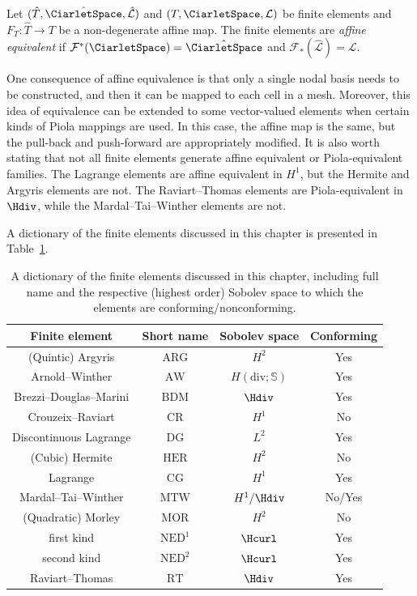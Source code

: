 \begin{definition}
  Let $(\hat{T}, \hat{\CiarletSpace}, \hat{\mathcal{L}})$ and
  $(T, \CiarletSpace, \mathcal{L})$ be finite elements and $F_T:
  \hat{T} \rightarrow T$ be a non-degenerate affine map. The finite
  elements are \emph{affine equivalent} if
  $\mathcal{F}^*(\CiarletSpace) = \hat{\CiarletSpace}$ and
  $\mathcal{F}_*(\hat{\mathcal{L}}) = \mathcal{L}$.
\end{definition}
One consequence of affine equivalence is that only a single nodal
basis needs to be constructed, and then it can be mapped to each cell
in a mesh. Moreover, this idea of equivalence can be extended to some
vector-valued elements when certain kinds of Piola mappings are used.
In this case, the affine map is the same, but the pull-back and
push-forward are appropriately modified.  It is also worth stating
that not all finite elements generate affine equivalent or
Piola-equivalent families. The Lagrange elements are affine equivalent
in $H^1$, but the Hermite and Argyris elements are not. The
Raviart--Thomas elements are Piola-equivalent in $\Hdiv$, while the
Mardal--Tai--Winther elements are not.

A dictionary of the finite elements discussed in this chapter is
presented in Table~\ref{kirby-6:tab:overview}.
\begin{table}
  \centering
  \begin{tabular}{cccc}
    \toprule
    Finite element & Short name & Sobolev space & Conforming\\
    \midrule
    (Quintic) Argyris & $\mathrm{ARG}$ & $H^2$ &Yes \\
    Arnold--Winther & $\mathrm{AW}$ & $H(\mathrm{div}; \mathbb{S})$ &Yes \\
    Brezzi--Douglas--Marini & $\mathrm{BDM}$ & $\Hdiv$ & Yes \\
    Crouzeix--Raviart & $\mathrm{CR}$ & $H^1$ & No \\
    Discontinuous Lagrange & $\mathrm{DG}$ & $L^2$ & Yes \\
    (Cubic) Hermite & $\mathrm{HER}$ & $H^2$ & No \\
    Lagrange & $\mathrm{CG}$ & $H^1$ & Yes \\
    Mardal--Tai--Winther & $\mathrm{MTW}$ & $H^1/\Hdiv$ & No/Yes \\
    (Quadratic) Morley & $\mathrm{MOR}$ & $H^2$ & No \\
    \nedelec{} first kind & $\mathrm{NED^1}$ & $\Hcurl$ & Yes \\
    \nedelec{} second kind & $\mathrm{NED^2}$ & $\Hcurl$ & Yes \\
    Raviart--Thomas & $\mathrm{RT}$ & $\Hdiv$ & Yes \\
    \bottomrule
  \end{tabular}
  \caption{A dictionary of the finite elements discussed in this
    chapter, including full name and the respective (highest order)
    Sobolev space to which the elements are conforming/nonconforming.}
  \label{kirby-6:tab:overview}
\end{table}

